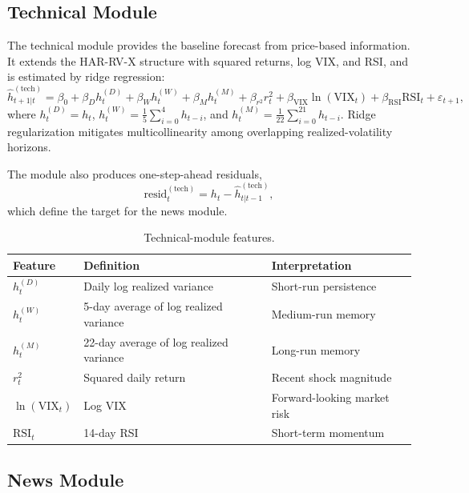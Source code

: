 \documentclass[review]{elsarticle}
\begin{document}
\subsection{Technical Module}\label{technical-agent}

The technical module provides the baseline forecast from price-based information. It extends the HAR-RV-X structure with squared returns, log VIX, and RSI, and is estimated by ridge regression:
\begin{equation}\label{eq:tech-agent}
\widehat{h}_{t+1|t}^{(\text{tech})}
= \beta_0
+ \beta_D h_t^{(D)}
+ \beta_W h_t^{(W)}
+ \beta_M h_t^{(M)}
+ \beta_{r^2} r_t^2
+ \beta_{\text{VIX}} \ln(\text{VIX}_t)
+ \beta_{\text{RSI}} \text{RSI}_t
+ \varepsilon_{t+1},
\end{equation}
where $h_t^{(D)} = h_t$, $h_t^{(W)} = \frac{1}{5}\sum_{i=0}^{4} h_{t-i}$, and $h_t^{(M)} = \frac{1}{22}\sum_{i=0}^{21} h_{t-i}$. Ridge regularization mitigates multicollinearity among overlapping realized-volatility horizons.

The module also produces one-step-ahead residuals,
\[
\text{resid}_{t}^{(\text{tech})} = h_t - \widehat{h}_{t|t-1}^{(\text{tech})},
\]
which define the target for the news module.

\begin{table}[t]
\centering
\caption{Technical-module features.}
\label{tab:technical-features}
\begin{tabular}{lll}
\hline
Feature & Definition & Interpretation \\\hline
$h_t^{(D)}$ & Daily log realized variance & Short-run persistence \\
$h_t^{(W)}$ & 5-day average of log realized variance & Medium-run memory \\
$h_t^{(M)}$ & 22-day average of log realized variance & Long-run memory \\
$r_t^2$ & Squared daily return & Recent shock magnitude \\
$\ln(\text{VIX}_t)$ & Log VIX & Forward-looking market risk \\
$\text{RSI}_t$ & 14-day RSI & Short-term momentum \\\hline
\end{tabular}
\end{table}

\subsection{News Module}\label{news-agent}
\end{document}
